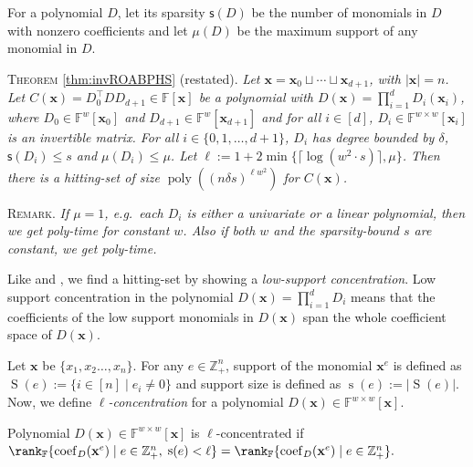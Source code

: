 \documentclass[final,oneeqnum, onethmnum, onefignum]{siamltex1213}
\newcommand{\Zp}{\mathbb{Z}_+}
\newcommand{\F}{\mathbb F}
\newcommand{\abs}[1]{\lvert #1 \rvert}
\newcommand{\ceil}[1]{\lceil #1 \rceil}
\newcommand{\degree}{\delta} %
\newcommand{\coeff}{\operatorname{coef}}
\newcommand{\Dx}{D(\mathbf{x})}
\DeclareMathOperator{\poly}{poly}
\DeclareMathOperator{\Supp}{S} %
\DeclareMathOperator{\suppo}{s} %
\renewcommand{\sp}{\mathsf{s}} %
\newcommand{\Sp}{\mathsf{S}}
\newcommand{\x}{\mathbf{x}}
\renewcommand{\o}[1]{\overline{#1}}
\newenvironment{reptheorem}[1]{T\textsc{heorem} \ref{#1} (restated).\em}{}
\newenvironment{remark}{R\textsc{emark}.\em}{}
\begin{document}
For a polynomial $D$, let its sparsity  
$\sp(D)$ be the number of monomials in $D$
with nonzero coefficients and
let $\mu(D)$ be the maximum support 
of any monomial in $D$.

\begin{reptheorem}{thm:invROABPHS}
\label{thm:ROABPHS-rep}
Let $\mathbf{x} = \mathbf{x}_0 \sqcup \dotsm \sqcup \mathbf{x}_{d+1}$, with $\abs{\mathbf{x}} = n$.
Let $C(\mathbf{x}) = D_0^{\top} D D_{d+1} \in \F[\mathbf{x}]$ be a polynomial
with $D(\mathbf{x}) = \prod_{i=1}^{d} D_i(\mathbf{x}_i)$, where
$D_0 \in \F^w[\mathbf{x}_0]$ and $D_{d+1} \in \F^w[\mathbf{x}_{d+1}]$
and for all $i \in [d]$, 
$D_i \in \F^{w \times w}[\mathbf{x}_i]$ is an invertible matrix.
For all $i \in \{0, 1, \dots, d+1 \}$, $D_i$ has degree bounded
by $\delta$, $\sp(D_i) \leq s$ and $\mu(D_i) \leq \mu$.
Let $\ell := 1 + 2 \min\{ \ceil{\log (w^2 \cdot s)}, \mu \}$.
Then there is a hitting-set of size 
$\poly((n \delta s)^{\ell w^2})$ for $C(\mathbf{x})$.
\end{reptheorem}

\begin{remark}
If $\mu=1$, e.g.\ each $D_i$ is either a univariate or a linear polynomial, then
we get poly-time for constant $w$. Also if both $w$
and the sparsity-bound $s$ are constant, we get poly-time.
\end{remark}

Like \cite{ASS13} and \cite{FSS13}, we find a hitting-set by showing
a {\em low-support concentration}. 
Low support concentration in the polynomial $D(\x) = \prod_{i=1}^{d} D_i $
means that the coefficients of the low support monomials in $D(\x)$ span the whole
coefficient space of $D(\x)$. 

Let $\x$ be $\{x_1, x_2 \dots, x_n\}$.
For any $e \in \Zp^n$, 
support of the monomial $\mathbf{x}^e$ is defined as 
$\Supp(e) := \{i \in [n] \mid e_i \neq 0 \}$
and support size is defined as $\suppo(e) := \abs{\Supp(e)}$.
Now, we define \emph{$\ell$-concentration} for a polynomial 
$ D(\x) \in \F^{w \times w}[\x]$.%

\begin{definition}
Polynomial $ \Dx \in \F^{w \times w}[\x]$ is $ \ell $-concentrated if
$
\rank_\F \{\coeff_D (\x^e) \mid e \in \Zp^n, \; \suppo(e) < \ell\} 
= \rank_\F \{\coeff_D (\x^e) \mid e \in \Zp^n\}.
$
\end{definition}
\end{document}
